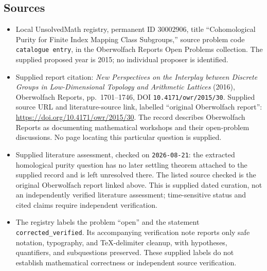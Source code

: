 \documentclass[11pt]{article}
\begin{document}
\subsection{Sources}
\begin{itemize}
\item Local UnsolvedMath registry, permanent ID $30002906$, title ``Cohomological Purity for Finite Index Mapping Class Subgroups,'' source problem code \texttt{catalogue entry}, in the Oberwolfach Reports Open Problems collection. The supplied proposed year is 2015; no individual proposer is identified.
\item Supplied report citation: \emph{New Perspectives on the Interplay between Discrete Groups in Low-Dimensional Topology and Arithmetic Lattices} (2016), Oberwolfach Reports, pp.~1701--1746, DOI \texttt{10.4171/owr/2015/30}. Supplied source URL and literature-source link, labelled ``original Oberwolfach report'': \url{https://doi.org/10.4171/owr/2015/30}. The record describes Oberwolfach Reports as documenting mathematical workshops and their open-problem discussions. No page locating this particular question is supplied.
\item Supplied literature assessment, checked on \texttt{2026-08-21}: the extracted homological purity question has no later settling theorem attached to the supplied record and is left unresolved there. The listed source checked is the original Oberwolfach report linked above. This is supplied dated curation, not an independently verified literature assessment; time-sensitive status and cited claims require independent verification.
\item The registry labels the problem ``open'' and the statement \texttt{corrected\_verified}. Its accompanying verification note reports only safe notation, typography, and TeX-delimiter cleanup, with hypotheses, quantifiers, and subquestions preserved. These supplied labels do not establish mathematical correctness or independent source verification.
\end{itemize}
\end{document}
